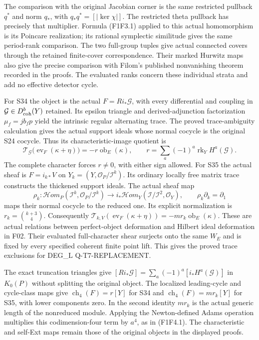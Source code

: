 The comparison with the original Jacobian corner is
the same restricted pullback $q^*$ and norm $q_*$,
with $q_*q^*=[|\ker\chi|]$. The restricted theta
pullback has precisely that multiplier. Formula
(F1F3.1) applied to this actual homomorphism is its
Poincare realization; its rational symplectic
similitude gives the same period-rank comparison.
The two full-group tuples give actual connected
covers through the retained finite-cover
correspondence. Their marked Hurwitz maps also
give the precise comparison with Filom's published
nonvanishing theorem recorded in the proofs.
The evaluated ranks concern these individual
strata and add no effective detector cycle.

For S34 the object is the actual
$F=Ri_*\mathcal G$, with every differential and
coupling in $\mathcal G\in D^b_{\rm coh}(Y)$ retained.
Its epsilon triangle and derived-adjunction
factorization $\mu_f=j b_f p$ yield the intrinsic
regular alternating trace. The proved trace-ambiguity
calculation gives the actual support ideals whose
normal cocycle is the original S24 cocycle.
Thus its characteristic-image quotient is
\[
 \mathcal T_{\mathcal G}\bigl(\operatorname{ev}_F
            (\kappa+\eta)\bigr)
                =-r\operatorname{ob}_E(\kappa),
 \qquad r=\sum_a(-1)^a\operatorname{rk}_Y H^a(\mathcal G).
\]
The complete character forces $r\ne0$, with either
sign allowed. For S35 the actual sheaf is
$F=i_{k*}V$ on $Y_k=(Y,\mathcal O_P/\mathcal I^k)$.
Its ordinary locally free matrix trace constructs
the thickened support ideals. The actual sheaf map
\[
 \rho_k:\mathcal Hom_P(\mathcal I^k,\mathcal O_P/\mathcal I^k)
       \longrightarrow
 i_*\mathcal Hom_Y(\mathcal I/\mathcal I^2,\mathcal O_Y),
 \qquad \rho_k\partial_k=\partial_1
\]
maps their normal cocycle to the reduced one.
Its explicit normalization is
$r_k=\binom{k+3}{4}$. Consequently
$\mathcal T_{k,V}(\operatorname{ev}_F(\kappa+\eta))
=-m r_k\operatorname{ob}_E(\kappa)$.
These are actual relations between perfect-object
deformation and Hilbert ideal deformation in F02.
Their evaluated full-character shear surjects onto
the same $W_E$ and is fixed by every specified
coherent finite point lift. This gives the proved
trace exclusions for DEG\_L Q-T7-REPLACEMENT.

The exact truncation triangles give
$[Ri_*\mathcal G]=\sum_a(-1)^a[i_*H^a(\mathcal G)]$
in $K_0(P)$ without splitting the original object.
The localized leading-cycle and cycle-class maps
give $\operatorname{ch}_4(F)=r[Y]$ for S34 and
$\operatorname{ch}_4(F)=m r_k[Y]$ for S35, with
lower components zero. In the second identity
$m r_k$ is the actual generic length of the
nonreduced module. Applying the Newton-defined
Adams operation multiplies this codimension-four
term by $a^4$, as in (F1F4.1). The characteristic
and self-Ext maps remain those of the original
objects in the displayed proofs.

